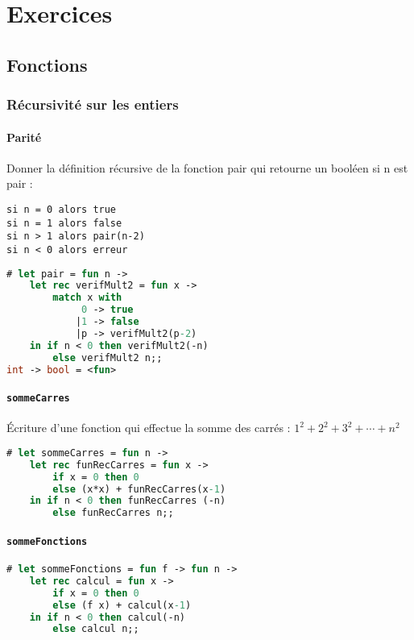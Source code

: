 \chapter{Exercices}
\section{Fonctions}
\subsection{Récursivité sur les entiers}
\subsubsection{Parité}
Donner la définition récursive de la fonction pair qui retourne un booléen si n est pair : 
\begin{lstlisting}[language=algo]
si n = 0 alors true
si n = 1 alors false
si n > 1 alors pair(n-2)
si n < 0 alors erreur
\end{lstlisting}
\begin{lstlisting}[language=Caml, caption=Exercice -- Fonction pair en récursif]
# let pair = fun n ->
	let rec verifMult2 = fun x ->
		match x with
			 0 -> true
			|1 -> false
			|p -> verifMult2(p-2)
	in if n < 0 then verifMult2(-n)
		else verifMult2 n;;
int -> bool = <fun>
\end{lstlisting}

\subsubsection{\texttt{sommeCarres}}
Écriture d'une fonction qui effectue la somme des carrés : $1^2+2^2+3^2+\cdots+n^2$
\begin{lstlisting}[language=Caml, caption=Exercice -- Fonction pair en récursif]
# let sommeCarres = fun n ->
	let rec funRecCarres = fun x -> 
		if x = 0 then 0
		else (x*x) + funRecCarres(x-1)
	in if n < 0 then funRecCarres (-n)
		else funRecCarres n;;
\end{lstlisting}

\subsubsection{\texttt{sommeFonctions}}
\begin{lstlisting}[language=Caml, caption=Exercice -- Fonction pair en récursif]
# let sommeFonctions = fun f -> fun n ->
	let rec calcul = fun x ->
		if x = 0 then 0
		else (f x) + calcul(x-1)
	in if n < 0 then calcul(-n)
		else calcul n;;
\end{lstlisting}
